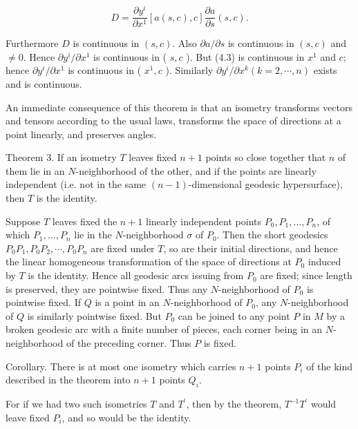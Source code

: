 \documentclass[10pt]{article}
\begin{document}
$$
D=\frac{\partial y^{i}}{\partial x^{1}}[a(s, c), c] \frac{\partial a}{\partial s}(s, c) .
$$

Furthermore $D$ is continuous in $(s, c)$. Also $\partial a / \partial s$ is continuous in $(s, c)$ and $\neq 0$. Hence $\partial y^{i} / \partial x^{1}$ is continuous in ( $s, c$ ). But (4.3) is continuous in $x^{1}$ and $c$; hence $\partial y^{i} / \partial x^{1}$ is continuous in ( $x^{1}, c$ ). Similarly $\partial y^{i} / \partial x^{k}(k=2, \cdots, n)$ exists and is continuous.

An immediate consequence of this theorem is that an isometry transforms vectors and tensors according to the usual laws, transforms the space of directions at a point linearly, and preserves angles.

Theorem 3. If an isometry $T$ leaves fixed $n+1$ points so close together that $n$ of them lie in an $N$-neighborhood of the other, and if the points are linearly independent (i.e. not in the same $(n-1)$-dimensional geodesic hypersurface), then $T$ is the identity.

Suppose $T$ leaves fixed the $n+1$ linearly independent points $P_{0}, P_{1}, \ldots, P_{n}$, of which $P_{1}, \ldots, P_{n}$ lie in the $N$-neighborhood $\sigma$ of $P_{0}$. Then the short geodesics $P_{0} P_{1}, P_{0} P_{2}, \cdots, P_{0} P_{n}$ are fixed under $T$, so are their initial directions, and hence the linear homogeneous transformation of the space of directions at $P_{0}$ induced by $T$ is the identity. Hence all geodesic arcs issuing from $P_{0}$ are fixed; since length is preserved, they are pointwise fixed. Thus any $N$-neighborhood of $P_{0}$ is pointwise fixed. If $Q$ is a point in an $N$-neighborhood of $P_{0}$, any $N$-neighborhood of $Q$ is similarly pointwise fixed. But $P_{0}$ can be joined to any point $P$ in $M$ by a broken geodesic arc with a finite number of pieces, each corner being in an $N$-neighborhood of the preceding corner. Thus $P$ is fixed.

Corollary. There is at most one isometry which carries $n+1$ points $P_{i}$ of the kind described in the theorem into $n+1$ points $Q_{i}$.

For if we had two such isometries $T$ and $T^{\prime}$, then by the theorem, $T^{-1} T^{\prime}$ would leave fixed $P_{i}$, and so would be the identity.
\end{document}
